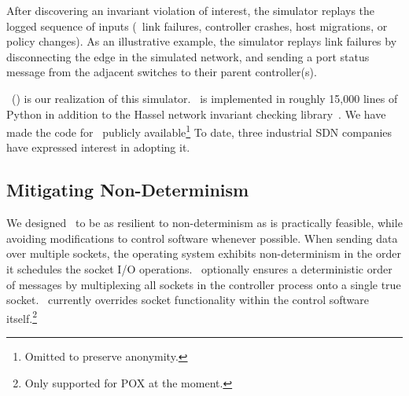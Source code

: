 After discovering an invariant violation of interest, the simulator replays
the logged sequence of inputs (\eg~link failures, controller crashes, host migrations,
or policy changes). As an illustrative example, the simulator replays link failures
by disconnecting the edge in the simulated network, and sending a
port status message from the adjacent switches to their parent controller(s).


\projectname~(\projectmeaning) is our realization of this simulator.
\projectname~is implemented in roughly 15,000 lines of Python in
addition to the Hassel network invariant checking library~\cite{hsa}. We have
made the code
for \projectname~publicly available\footnote{Omitted to preserve anonymity.}
To date, three industrial SDN companies have expressed interest in adopting it.

\subsection{Mitigating Non-Determinism}

We designed \projectname~to be as resilient to non-determinism as is
practically feasible, while avoiding modifications to control software whenever possible.
When sending data over multiple sockets, the operating system exhibits
non-determinism in the order it schedules the socket I/O operations.
\projectname~optionally ensures a deterministic order of messages
by multiplexing all sockets in the controller process
onto a single true socket. \projectname~currently overrides socket functionality within the control
software itself.\footnote{Only supported for POX at the moment.}

